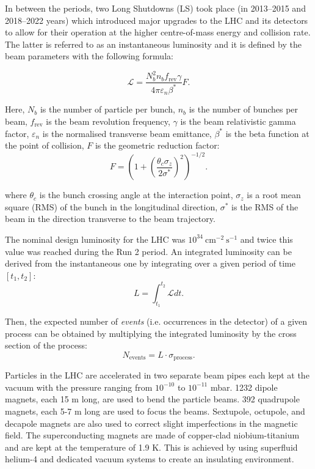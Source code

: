 In between the periods, two Long Shutdowns (LS) took place (in 2013–2015 and 2018–2022 years) which introduced major upgrades to the LHC and its detectors to allow for their operation at the higher centre-of-mass energy and collision rate. The latter is referred to as an instantaneous luminosity and it is defined by the beam parameters with the following formula:  

\begin{equation}
    \mathcal{L} = \dfrac{N_b^2 n_b f_\text{rev} \gamma}{4\pi \varepsilon_n \beta^*}F.
\end{equation}

Here, $N_b$ is the number of particle per bunch, $n_b$ is the number of bunches per beam, $f_\text{rev}$ is the beam revolution frequency, $\gamma$ is the beam relativistic gamma factor, $\varepsilon_n$ is the normalised transverse beam emittance, $\beta^*$ is the beta function at the point of collision, $F$ is the geometric reduction factor:
\begin{equation}
    F = \left(1 + \left(\dfrac{\theta_c \sigma_z}{2\sigma^*}\right)^2\right)^{-1/2}.
\end{equation}

where $\theta_c$ is the bunch crossing angle at the interaction point, $\sigma_z$ is a root mean square (RMS) of the bunch in the longitudinal direction, $\sigma^*$ is the RMS of the beam in the direction transverse to the beam trajectory.  

The nominal design luminosity for the LHC was $10^{34} ~\text{cm}^{-2}~\text{s}^{-1}$ and twice this value was reached during the Run 2 period.  An integrated luminosity can be derived from the instantaneous one by integrating over a given period of time $[t_1, t_2]$:
\begin{equation}
L = \int_{t_1}^{t_2} \mathcal{L}dt.
\end{equation} 

Then, the expected number of \textit{events} (i.e. occurrences in the detector) of a given process can be obtained by multiplying the integrated luminosity by the cross section of the process:
\begin{equation}
    N_\text{events} = L \cdot \sigma_\text{process}.
\end{equation}

Particles in the LHC are accelerated in two separate beam pipes each kept at the vacuum with the pressure ranging from $10^{-10}$ to $10^{-11}$ mbar. 1232 dipole magnets, each 15 m long, are used to bend the particle beams. 392 quadrupole magnets, each 5-7 m long are used to focus the beams. Sextupole, octupole, and decapole magnets are also used to correct slight imperfections in the magnetic field. The superconducting magnets are made of copper-clad niobium-titanium and are kept at the temperature of 1.9 K. This is achieved by using superfluid helium-4 and dedicated vacuum systems to create an insulating environment.   

